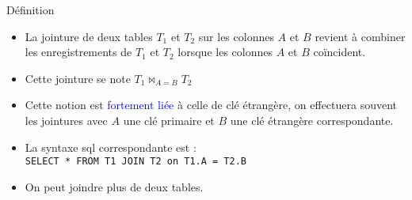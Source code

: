 \documentclass[10pt]{beamer}
\begin{document}
\begin{frame}{\Ctitle}{\stitle}
	\begin{block}{Définition}
		\begin{itemize}
			\item<1-> La jointure de deux tables $T_1$ et $T_2$ sur les colonnes $A$ et $B$ revient à combiner les enregistrements de $T_1$ et $T_2$ lorsque les colonnes $A$ et $B$ coïncident.
			\item<2-> Cette jointure se note $T_1 \Join_{A=B} T_2$
			\item<3-> Cette notion est \textcolor{blue}{fortement liée} à celle  de clé étrangère, on effectuera souvent les jointures avec $A$ une clé primaire et $B$ une clé étrangère correspondante.
			\item<4-> La syntaxe {\sc sql} correspondante est : \\ \texttt{SELECT * FROM T1 JOIN T2 on T1.A = T2.B}
			\item<5-> On peut joindre plus de deux tables.
		\end{itemize}
	\end{block}
\end{frame}
\end{document}
